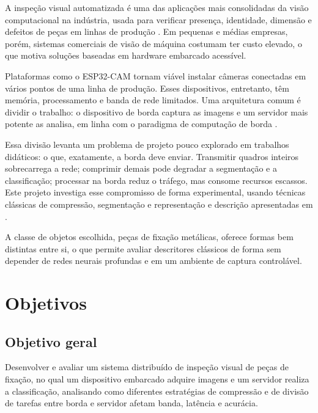 \documentclass[12pt]{article}
\begin{document}
A inspeção visual automatizada é uma das aplicações mais consolidadas da visão computacional na indústria, usada para verificar presença, identidade, dimensão e defeitos de peças em linhas de produção \cite{golnabi2007}. Em pequenas e médias empresas, porém, sistemas comerciais de visão de máquina costumam ter custo elevado, o que motiva soluções baseadas em hardware embarcado acessível.

Plataformas como o ESP32-CAM tornam viável instalar câmeras conectadas em vários pontos de uma linha de produção. Esses dispositivos, entretanto, têm memória, processamento e banda de rede limitados. Uma arquitetura comum é dividir o trabalho: o dispositivo de borda captura as imagens e um servidor mais potente as analisa, em linha com o paradigma de computação de borda \cite{shi2016,satyanarayanan2017}.

Essa divisão levanta um problema de projeto pouco explorado em trabalhos didáticos: o que, exatamente, a borda deve enviar. Transmitir quadros inteiros sobrecarrega a rede; comprimir demais pode degradar a segmentação e a classificação; processar na borda reduz o tráfego, mas consome recursos escassos. Este projeto investiga esse compromisso de forma experimental, usando técnicas clássicas de compressão, segmentação e representação e descrição apresentadas em \cite{gonzalez2018}.

A classe de objetos escolhida, peças de fixação metálicas, oferece formas bem distintas entre si, o que permite avaliar descritores clássicos de forma sem depender de redes neurais profundas e em um ambiente de captura controlável.

\section{Objetivos}
\label{sec:objetivos}

\subsection{Objetivo geral}

Desenvolver e avaliar um sistema distribuído de inspeção visual de peças de fixação, no qual um dispositivo embarcado adquire imagens e um servidor realiza a classificação, analisando como diferentes estratégias de compressão e de divisão de tarefas entre borda e servidor afetam banda, latência e acurácia.
\end{document}
